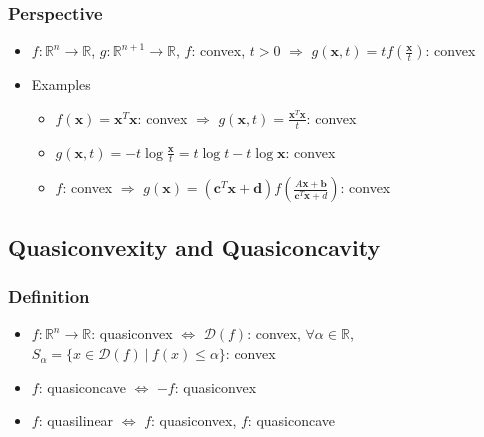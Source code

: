 \subsubsection*{Perspective}
\begin{itemize}
    \item $f:\mathbb{R}^n \rightarrow \mathbb{R}$, $g:\mathbb{R}^{n+1} \rightarrow \mathbb{R}$,
        $f$: convex, $t>0$ $\Rightarrow$ $g(\mathbf{x}, t) = t f\left( \frac {\mathbf{x}} t \right)$: convex
    \item Examples
    \begin{itemize}
        \item $f(\mathbf{x}) = \mathbf{x}^T\mathbf{x}$: convex
            $\Rightarrow$ $g(\mathbf{x}, t) = \frac {\mathbf{x}^T\mathbf{x}} t$: convex
        \item $g(\mathbf{x}, t) = -t\log {\frac {\mathbf{x}} t} = t\log t - t\log \mathbf{x}$: convex
        \item $f$: convex $\Rightarrow$
            $g(\mathbf{x}) = \left(\mathbf{c}^T\mathbf{x} + \mathbf{d}\right) f \left( \frac {A\mathbf{x} + \mathbf{b}} {\mathbf{c}^T\mathbf{x} + d} \right)$: convex
    \end{itemize}
\end{itemize}

\subsection{Quasiconvexity and Quasiconcavity}

\subsubsection*{Definition}
\begin{itemize}
    \item $f:\mathbb{R}^n \rightarrow \mathbb{R}$: quasiconvex $\Leftrightarrow$ $\mathcal{D}(f)$: convex,
        $\forall \alpha \in \mathbb{R}$, $S_{\alpha} = \{x \in \mathcal{D}(f)~|~f(x)\leq\alpha\}$: convex
    \item $f$: quasiconcave $\Leftrightarrow$ $-f$: quasiconvex
    \item $f$: quasilinear $\Leftrightarrow$ $f$: quasiconvex, $f$: quasiconcave
\end{itemize}

